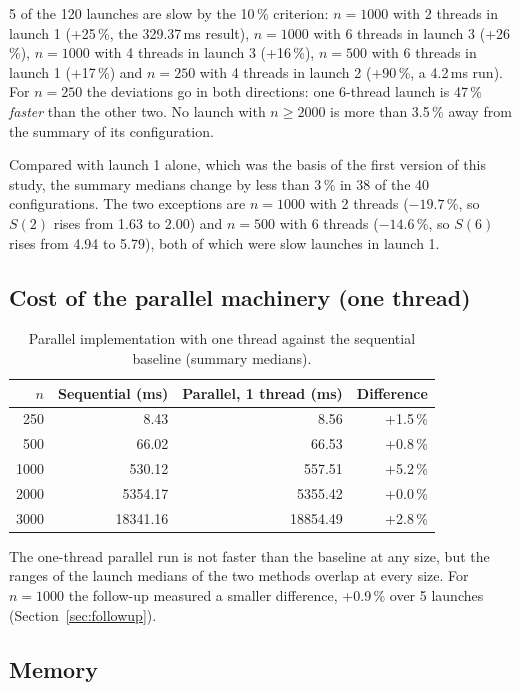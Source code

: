 \documentclass[11pt,a4paper]{article}
\begin{document}
5 of the 120 launches are slow by the 10\,\% criterion: $n = 1000$ with 2 threads in launch 1 (+25\,\%, the 329.37\,ms result), $n = 1000$ with 6 threads in launch 3 (+26\,\%), $n = 1000$ with 4 threads in launch 3 (+16\,\%), $n = 500$ with 6 threads in launch 1 (+17\,\%) and $n = 250$ with 4 threads in launch 2 (+90\,\%, a 4.2\,ms run). For $n = 250$ the deviations go in both directions: one 6-thread launch is 47\,\% \emph{faster} than the other two. No launch with $n \ge 2000$ is more than 3.5\,\% away from the summary of its configuration.

Compared with launch 1 alone, which was the basis of the first version of this study, the summary medians change by less than 3\,\% in 38 of the 40 configurations. The two exceptions are $n = 1000$ with 2 threads ($-19.7$\,\%, so $S(2)$ rises from 1.63 to 2.00) and $n = 500$ with 6 threads ($-14.6$\,\%, so $S(6)$ rises from 4.94 to 5.79), both of which were slow launches in launch 1.

\subsection{Cost of the parallel machinery (one thread)}

\begin{table}[H]
\centering\small
\caption{Parallel implementation with one thread against the sequential baseline (summary medians).}\label{tab:onethread}
\begin{tabular}{@{}rrrr@{}}
\toprule
$n$ & Sequential (ms) & Parallel, 1 thread (ms) & Difference \\
\midrule
250 & 8.43 & 8.56 & +1.5\,\% \\
500 & 66.02 & 66.53 & +0.8\,\% \\
1000 & 530.12 & 557.51 & +5.2\,\% \\
2000 & 5354.17 & 5355.42 & +0.0\,\% \\
3000 & 18341.16 & 18854.49 & +2.8\,\% \\
\bottomrule
\end{tabular}
\end{table}

The one-thread parallel run is not faster than the baseline at any size, but the ranges of the launch medians of the two methods overlap at every size. For $n = 1000$ the follow-up measured a smaller difference, +0.9\,\% over 5 launches (Section~\ref{sec:followup}).

\subsection{Memory}
\end{document}
